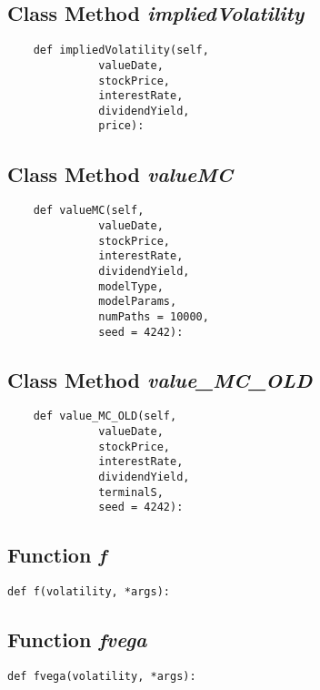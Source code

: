 \documentclass[twoside,11pt]{book}
\begin{document}
\subsection{Class Method {\it impliedVolatility}}


\begin{lstlisting}
    def impliedVolatility(self,
              valueDate,
              stockPrice,
              interestRate,
              dividendYield,
              price):
\end{lstlisting}

\subsection{Class Method {\it valueMC}}


\begin{lstlisting}
    def valueMC(self,
              valueDate,
              stockPrice,
              interestRate,
              dividendYield,
              modelType, 
              modelParams,
              numPaths = 10000,
              seed = 4242):
\end{lstlisting}

\subsection{Class Method {\it value\_MC\_OLD}}


\begin{lstlisting}
    def value_MC_OLD(self,
              valueDate,
              stockPrice,
              interestRate,
              dividendYield,
              terminalS,
              seed = 4242):
\end{lstlisting}

\subsection{Function {\it f}}


\begin{lstlisting}
def f(volatility, *args):
\end{lstlisting}

\subsection{Function {\it fvega}}


\begin{lstlisting}
def fvega(volatility, *args):
\end{lstlisting}
\end{document}
